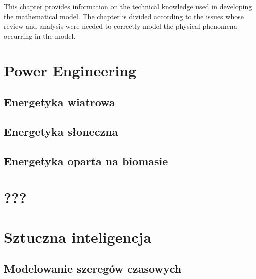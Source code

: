 This chapter provides information on the technical knowledge used in developing the mathematical model.
The chapter is divided according to the issues whose review and analysis were needed
to correctly model the physical phenomena occurring in the model.

\section{Power Engineering}


\subsection{Energetyka wiatrowa}

\subsection{Energetyka słoneczna}

\subsection{Energetyka oparta na biomasie}

\section{???}

\section{Sztuczna inteligencja}

\subsection{Modelowanie szeregów czasowych}
